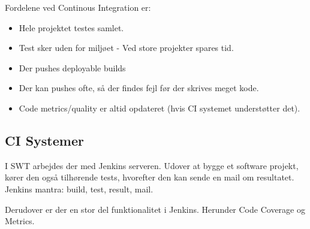Fordelene ved Continous Integration er:

\begin{itemize}
	\item Hele projektet testes samlet.
	\item Test sker uden for miljøet - Ved store projekter spares tid.
	\item Der pushes deployable builds 
	\item Der kan pushes ofte, så der findes fejl før der skrives meget kode.
	\item Code metrics/quality er altid opdateret (hvis CI systemet understøtter det).
\end{itemize}

\subsection{CI Systemer}
I SWT arbejdes der med Jenkins serveren. Udover at bygge et software projekt, kører den også tilhørende tests, hvorefter den kan sende en mail om resultatet.
Jenkins mantra: build, test, result, mail. 

Derudover er der en stor del funktionalitet i Jenkins. Herunder Code Coverage og Metrics.


